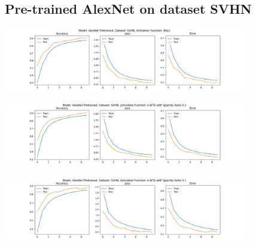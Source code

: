 \documentclass[a4paper]{article}
\begin{document}
		\subsection{Pre-trained AlexNet on dataset SVHN}
			\begin{center}
				\centering
				\includegraphics[width=400px,keepaspectratio]{AlexNet_SVHN_ReLU_Pretrained.png}
			\end{center}
			\begin{center}
				\centering
				\includegraphics[width=400px,keepaspectratio]{AlexNet_SVHN_k-WTA_0.2_Pretrained.png}
			\end{center}
			\begin{center}
				\centering
				\includegraphics[width=400px,keepaspectratio]{AlexNet_SVHN_k-WTA_0.1_Pretrained.png}
			\end{center}
		
\end{document}
